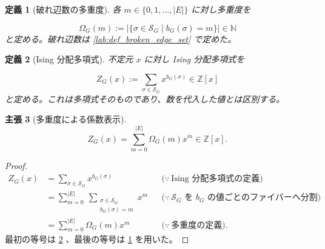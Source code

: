 \documentclass[11pt,a4paper]{article}
\newtheorem{definition}{定義}[section]
\newtheorem{claim}[definition]{主張}
\theoremstyle{remark}
\begin{document}
\begin{definition}[破れ辺数の多重度]\label{lab:def_broken_edge_multiplicity}
各 
$m\in\{0,1,\ldots,|E|\}$
 に対し多重度を

\[\Omega_G(m):=|\{\sigma\in\mathcal S_G\mid b_G(\sigma)=m\}|\in\mathbb N\]
と定める。破れ辺数は 
\cref{lab:def_broken_edge_set}
 で定めた。

\end{definition}

\begin{definition}[Ising 分配多項式]\label{lab:def_ising_partition_polynomial}
不定元 
$x$
 に対し Ising 分配多項式を

\[Z_G(x):=\sum_{\sigma\in\mathcal S_G}x^{b_G(\sigma)}\in\mathbb Z[x]\]
と定める。これは多項式そのものであり、数を代入した値とは区別する。

\end{definition}

\begin{claim}[多重度による係数表示]\label{lab:claim_partition_polynomial_coefficient_expansion}
\[Z_G(x)=\sum_{m=0}^{|E|}\Omega_G(m)x^m\in\mathbb Z[x].\]
\end{claim}
\begin{proof}
\[\begin{aligned}
Z_G(x)
&=\sum_{\sigma\in\mathcal S_G}x^{b_G(\sigma)}
&&\bigl(\because\ \text{Ising 分配多項式の定義}\bigr)\\
&=\sum_{m=0}^{|E|}\ \sum_{\substack{\sigma\in\mathcal S_G\\ b_G(\sigma)=m}}x^m
&&\bigl(\because\ \mathcal S_G\text{ を }b_G\text{ の値ごとのファイバーへ分割}\bigr)\\
&=\sum_{m=0}^{|E|}\Omega_G(m)x^m
&&\bigl(\because\ \text{多重度の定義}\bigr).
\end{aligned}\]
最初の等号は 
\cref{lab:def_ising_partition_polynomial}
、最後の等号は 
\cref{lab:def_broken_edge_multiplicity}
 を用いた。

\end{proof}
\end{document}
